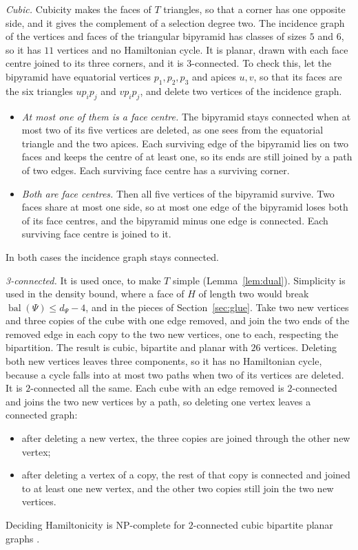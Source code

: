 \documentclass[10pt]{amsart}
\numberwithin{equation}{section}
\theoremstyle{definition}
\theoremstyle{remark}
\newcommand{\T}{T}
\newcommand{\bal}{\operatorname{bal}}
\begin{document}
\emph{Cubic.} Cubicity makes the faces of $\T$ triangles, so that a corner has one opposite side, and it gives the complement of a selection degree two.
The incidence graph of the vertices and faces of the triangular bipyramid has classes of sizes $5$ and $6$, so it has $11$ vertices and no Hamiltonian cycle.
It is planar, drawn with each face centre joined to its three corners, and it is $3$-connected.
To check this, let the bipyramid have equatorial vertices $p_1,p_2,p_3$ and apices $u,v$, so that its faces are the six triangles $up_ip_j$ and $vp_ip_j$, and delete two vertices of the incidence graph.
\begin{itemize}
\item \emph{At most one of them is a face centre.}
The bipyramid stays connected when at most two of its five vertices are deleted, as one sees from the equatorial triangle and the two apices.
Each surviving edge of the bipyramid lies on two faces and keeps the centre of at least one, so its ends are still joined by a path of two edges.
Each surviving face centre has a surviving corner.
\item \emph{Both are face centres.}
Then all five vertices of the bipyramid survive.
Two faces share at most one side, so at most one edge of the bipyramid loses both of its face centres, and the bipyramid minus one edge is connected.
Each surviving face centre is joined to it.
\end{itemize}
In both cases the incidence graph stays connected.

\emph{3-connected.} It is used once, to make $\T$ simple (Lemma~\ref{lem:dual}). Simplicity is used in the density bound, where a face of $H$ of length two would break $\bal(\Psi)\le d_{\Psi}-4$, and in the pieces of Section~\ref{sec:glue}.
Take two new vertices and three copies of the cube with one edge removed, and join the two ends of the removed edge in each copy to the two new vertices, one to each, respecting the bipartition.
The result is cubic, bipartite and planar with $26$ vertices.
Deleting both new vertices leaves three components, so it has no Hamiltonian cycle, because a cycle falls into at most two paths when two of its vertices are deleted.
It is $2$-connected all the same.
Each cube with an edge removed is $2$-connected and joins the two new vertices by a path, so deleting one vertex leaves a connected graph:
\begin{itemize}
\item after deleting a new vertex, the three copies are joined through the other new vertex;
\item after deleting a vertex of a copy, the rest of that copy is connected and joined to at least one new vertex, and the other two copies still join the two new vertices.
\end{itemize}
Deciding Hamiltonicity is NP-complete for $2$-connected cubic bipartite planar graphs \cite{Akiyama1980}.
\end{document}
